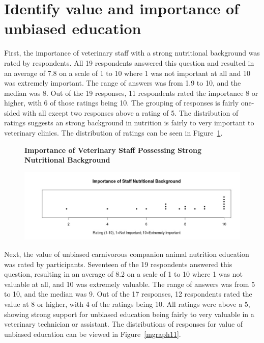 \section{Identify value and importance of unbiased education}
First, the importance of veterinary staff with a strong nutritional background was rated by respondents. All 19 respondents answered this question and resulted in an average of 7.8 on a scale of 1 to 10 where 1 was not important at all and 10 was extremely important. The range of answers was from 1.9 to 10, and the median was 8. Out of the 19 responses, 11 respondents rated the importance 8 or higher, with 6 of those ratings being 10. The grouping of responses is fairly one-sided with all except two responses above a rating of 5. The distribution of ratings suggests an strong background in nutrition is fairly to very important to veterinary clinics. The distribution of ratings can be seen in Figure~\ref{mgraph10}.
    \begin{figure}[htbp] 
    \centering
    \textbf{Importance of Veterinary Staff Possessing Strong Nutritional Background}\par\medskip
    \includegraphics[width=1.0\textwidth]{Images/iosnb.jpeg}
    \label{mgraph10}
    \end{figure}
\par Next, the value of unbiased carnivorous companion animal nutrition education was rated by participants. Seventeen of the 19 respondents answered this question, resulting in an average of 8.2 on a scale of 1 to 10 where 1 was not valuable at all, and 10 was extremely valuable. The range of answers was from 5 to 10, and the median was 9. Out of the 17 responses, 12 respondents rated the value at 8 or higher, with 4 of the ratings being 10. All ratings were above a 5, showing strong support for unbiased education being fairly to very valuable in a veterinary technician or assistant. The distributions of responses for value of unbiased education can be viewed in Figure~\ref{mgraph11}.
